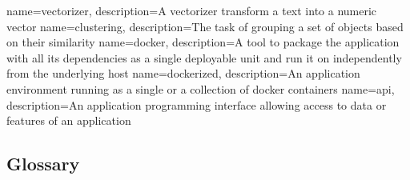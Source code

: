
\renewcommand{\glossarysection}[2][]{}

{
    name=vectorizer,
    description={A vectorizer transform a text into a numeric vector}
}
{
    name=clustering,
    description={The task of grouping a set of objects based on their similarity}
}
{
    name=docker,
    description={A tool to package the application with all its dependencies as a single deployable unit and run it on independently from the underlying host}
}
{
    name=dockerized,
    description={An application environment running as a single or a collection of docker containers}
}
{
    name=api,
    description={An application programming interface allowing access to data or features of an application}
}

\subsection{Glossary}
\printglossary[type=main]
